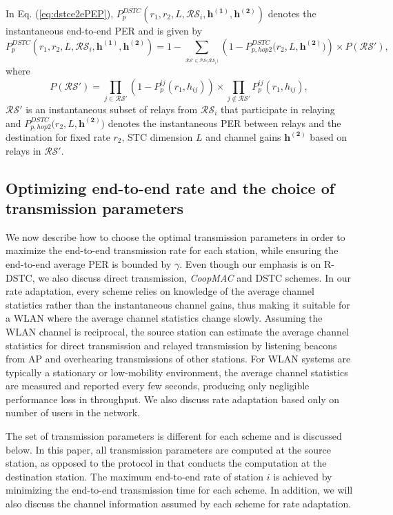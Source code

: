 \documentclass[peerreview,draftcls,onecolumn,12pt,a4paper]{IEEEtran}
\begin{document}
In Eq. (\ref{eq:dstce2ePEP}), ${P}_{p}^{DSTC}(r_1, r_2, L,
\mathcal{RS}_i, {\mathbf{h^{(1)}}}, \mathbf{h^{(2)}}) $ denotes
the instantaneous end-to-end PER and is given by
\begin{equation}
{P}_{p}^{DSTC}(r_1, r_2, L, \mathcal{RS}_i, {\mathbf{h^{(1)}}},
\mathbf{h^{(2)}}) = 1 - \sum_{_{\mathcal{RS}' \in \mathcal {PS
(RS}_i) }} { (1-P_{p, hop2}^{DSTC}{\mathbf(r_2, L,
\mathbf{h^{(2)}})}) \times P({\mathcal{RS}'})},
\label{eq:per_dstc_inst}
\end{equation}
where
\begin{equation}
P({\mathcal{RS}'}) =  \prod_{j \in \mathcal{RS}'}
(1-P_{p}^{ij}(r_1, h_{ij})) \times \prod_{j \notin \mathcal{RS}'}
P_{p}^{ij}(r_1, h_{ij}), \label{eq:per_dstc_subset}
\end{equation}
$\mathcal{RS}'$ is an instantaneous subset of relays from
$\mathcal{RS}_{i}$ that participate in relaying and $P_{p,
hop2}^{DSTC}{\mathbf(r_2, L, \mathbf{h^{(2)}})}$ denotes the
instantaneous PER  between relays and the destination for fixed
rate $r_2$, STC dimension $L$ and channel gains $\mathbf{h^{(2)}}$
based on relays in $\mathcal{RS}'$.


\subsection{Optimizing end-to-end rate and the choice of transmission parameters}
We now describe how to choose the optimal transmission parameters
in order to maximize the end-to-end transmission rate for each
station, while ensuring the end-to-end average PER is bounded by
$\gamma$. Even though our emphasis is on R-DSTC, we also discuss
direct transmission, \emph{CoopMAC} and DSTC schemes. In our rate
adaptation, every scheme relies on knowledge of the average
channel statistics rather than the instantaneous channel gains,
thus making it suitable for a WLAN where the average
channel statistics change slowly. Assuming the WLAN channel is
reciprocal, the source station can estimate the average channel
statistics for direct transmission and relayed transmission by
listening beacons from AP and overhearing transmissions of other
stations. For WLAN systems are typically a stationary
or low-mobility environment, the average channel statistics are
measured and reported every few seconds, producing only negligible
performance loss in throughput. We also discuss rate adaptation based only on number of users in the network.

The set of transmission parameters is different for each scheme
and is discussed below. In this paper, all transmission parameters
are computed at the source station, as opposed to the protocol in
\cite{RcoopMAC} that conducts the computation at the destination
station. The maximum end-to-end rate of station $i$ is achieved by
minimizing the end-to-end transmission time for each scheme. In
addition, we will also discuss the channel information assumed by
each scheme for rate adaptation.
\end{document}
